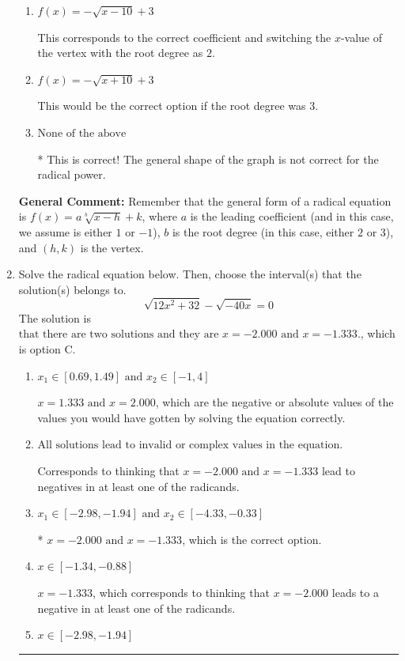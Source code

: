 \documentclass{extbook}[14pt]
\newcommand{\litem}[1]{\item #1

\rule{\textwidth}{0.4pt}}
\begin{document}
\begin{enumerate}
{\begin{enumerate}[label=\Alph*.]
This corresponds to switching the coefficient and having the correct vertex with the root degree as $2$.
\item \( f(x) = - \sqrt{x - 10} + 3 \)

This corresponds to the correct coefficient and switching the $x$-value of the vertex with the root degree as $2$.
\item \( f(x) = - \sqrt{x + 10} + 3 \)

This would be the correct option if the root degree was $3$.
\item \( \text{None of the above} \)

* This is correct! The general shape of the graph is not correct for the radical power.
\end{enumerate}

\textbf{General Comment:} Remember that the general form of a radical equation is $ f(x) = a \sqrt[b]{x - h} + k$, where $a$ is the leading coefficient (and in this case, we assume is either $1$ or $-1$), $b$ is the root degree (in this case, either $2$ or $3$), and $(h, k)$ is the vertex.
}
\litem{
Solve the radical equation below. Then, choose the interval(s) that the solution(s) belongs to.
\[ \sqrt{12 x^2 + 32} - \sqrt{-40 x} = 0 \]The solution is \( \text{that there are two solutions and they are } x = -2.000 \text{ and } x = -1.333. \), which is option C.\begin{enumerate}[label=\Alph*.]
\item \( x_1 \in [0.69, 1.49] \text{ and } x_2 \in [-1,4] \)

$x = 1.333 \text{ and } x = 2.000$, which are the negative or absolute values of the values you would have gotten by solving the equation correctly.
\item \( \text{All solutions lead to invalid or complex values in the equation.} \)

Corresponds to thinking that $x = -2.000 \text{ and } x = -1.333$ lead to negatives in at least one of the radicands.
\item \( x_1 \in [-2.98, -1.94] \text{ and } x_2 \in [-4.33,-0.33] \)

* $x = -2.000 \text{ and } x = -1.333$, which is the correct option.
\item \( x \in [-1.34,-0.88] \)

$x = -1.333$, which corresponds to thinking that $x = -2.000$ leads to a negative in at least one of the radicands.
\item \( x \in [-2.98,-1.94] \)


\end{enumerate}}
\end{enumerate}
\end{document}
